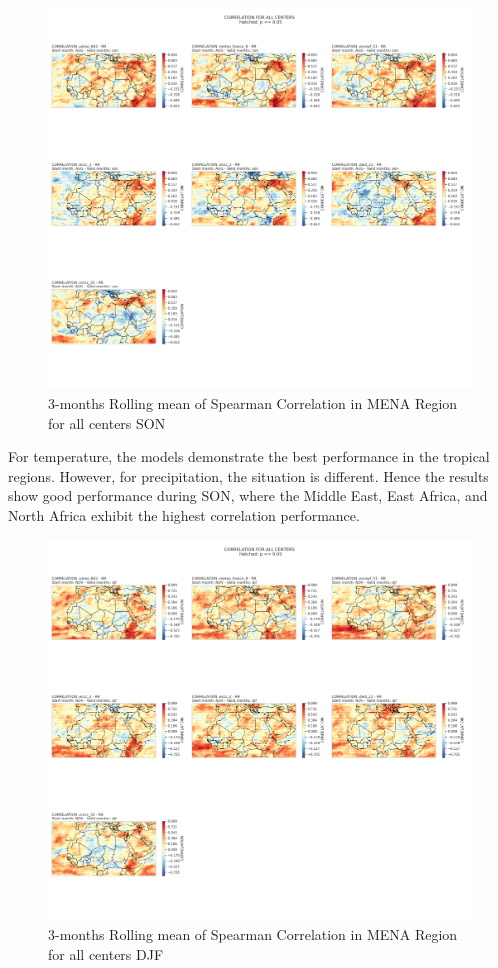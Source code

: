 \begin{figure}[H]
\centering
\includegraphics[scale=0.3]{plots/det/corr/CORR_son_RR.png}
\caption{3-months Rolling mean of Spearman Correlation in MENA Region for all centers SON}
\end{figure}
For temperature, the models demonstrate the best performance in the tropical regions. However, for precipitation, the situation is different. Hence the results show good performance during SON, where the Middle East, East Africa, and North Africa exhibit the highest correlation performance.
\begin{figure}[H]
\centering
\includegraphics[scale=0.3]{plots/det/corr/CORR_djf_RR.png}
\caption{3-months Rolling mean of Spearman Correlation in MENA Region for all centers DJF}
\end{figure}

